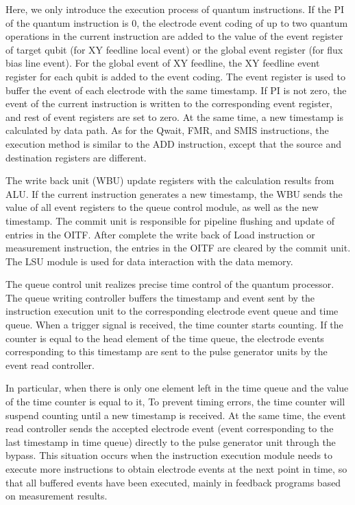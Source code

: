 Here, we only introduce the execution process of quantum instructions.
If the PI of the quantum instruction is 0, the electrode event coding of up to two quantum operations in the current 
instruction are added to the value of the event register of target qubit (for XY feedline local event) or the global event register (for flux bias line event). 
For the global event of XY feedline, the XY feedline event register for each qubit is added to the event coding. 
The event register is used to buffer the event of each electrode with the same timestamp. 
If PI is not zero, the event of the current instruction is written to the corresponding event register, 
and rest of event registers are set to zero. At the same time, a new timestamp is calculated by data path. 
As for the Qwait, FMR, and SMIS instructions, the execution method is similar to the ADD instruction, except that the source and destination registers are different. 

The write back unit (WBU) update registers with the calculation results from ALU. 
If the current instruction generates a new timestamp, the WBU sends the value of all event registers to the queue control module, 
as well as the new timestamp. The commit unit is responsible for pipeline flushing and update of entries in the OITF. 
After complete the write back of Load instruction or measurement instruction, the entries in the OITF are cleared by the commit unit. 
The LSU module is used for data interaction with the data memory.

The queue control unit realizes precise time control of the quantum processor. The queue writing controller buffers the timestamp and event sent by the instruction execution unit to the corresponding electrode event queue and time queue. 
When a trigger signal is received, the time counter starts counting. If the counter is equal to the head element of the time queue, the electrode events corresponding to this timestamp are sent to the pulse generator units by the event read controller. 

In particular, when there is only one element left in the time queue and the value of the time counter is equal to it, 
To prevent timing errors, the time counter will suspend counting until a new timestamp is received. At the same time, 
the event read controller sends the accepted electrode event (event corresponding to the last timestamp in time queue) directly to the pulse generator unit through the bypass.
This situation occurs when the instruction execution module needs to execute more instructions to obtain electrode events at the next point in time, 
so that all buffered events have been executed, mainly in feedback programs based on measurement results.

